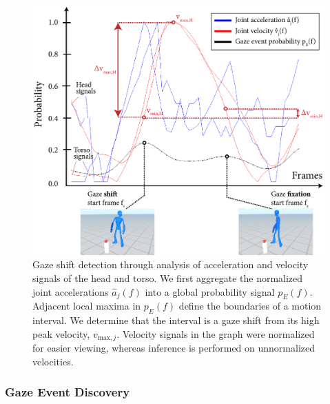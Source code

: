\begin{figure}
\centering
\includegraphics[width=1\textwidth]{gazeauthoring/Figures/GazeInstanceInference.pdf}
\caption{Gaze shift detection through analysis of acceleration and velocity signals of the head and torso. We first aggregate the normalized joint accelerations $\hat{a}_j(f)$ into a global probability signal $p_E(f)$. Adjacent local maxima in $p_E(f)$ define the boundaries of a motion interval. We determine that the interval is a gaze shift from its high peak velocity, $v_{\mathrm{max},j}$. Velocity signals in the graph were normalized for easier viewing, whereas inference is performed on unnormalized velocities.}
\label{fig:GazeInstanceInference}
\end{figure}

\subsubsection{Gaze Event Discovery}

